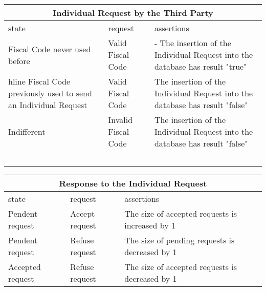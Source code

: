 \begin{center}
	\begin{tabular}{|p{}|p{}|p{}|}
		\hline
		\multicolumn{3}{c}{Individual Request by the Third Party}\\
		
		\hline
		state & request & assertions \\
		
		\hline
		Fiscal Code never used before &
		Valid Fiscal Code &
		- The insertion of the Individual Request into the database has result "true"\newline
		\\
		
		hline
		Fiscal Code previously used to send an Individual Request&
		Valid Fiscal Code &
		The insertion of the Individual Request into the database has result "false" \newline
		\\
		
		\hline
		Indifferent&
		Invalid Fiscal Code &
		The insertion of the Individual Request into the database has result "false" \newline
		\\
		
		\
		\hline
		
	\end{tabular}
\end{center}

\begin{center}
	\begin{tabular}{|p{}|p{}|p{}|}
		\hline
		\multicolumn{3}{c}{Response to the Individual Request}\\
		
		\hline
		state & request & assertions \\
		
		\hline
		Pendent request& 
		Accept request &
		The size of accepted requests is increased by 1 \newline
		\\
		
		\hline
		Pendent request& 
		Refuse request &
		The size of pending requests is decreased by 1 \newline
		\\
		
		\hline
		Accepted request & 
		Refuse request &
		The size of accepted requests is decreased by 1 \newline
		\\
	\end{tabular}
\end{center}

